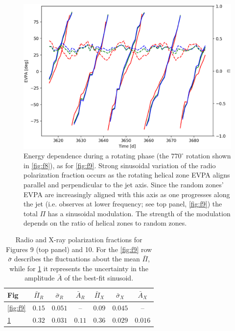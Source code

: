 \begin{figure}[t]
\includegraphics[width=0.8\linewidth]{figures/f10.eps}
\centering
\caption{Energy dependence during a rotating phase (the $770^{\circ}$ rotation shown in \cref{fig:f8}), as for \cref{fig:f9}. Strong sinusoidal variation of the radio polarization fraction occurs as the rotating helical zone EVPA aligns parallel and perpendicular to the jet axis. Since the random zones' EVPA are increasingly aligned with this axis as one progresses along the jet (i.e. observes at lower frequency; see top panel, \cref{fig:f9}) the total $\Pi$ has a sinusoidal modulation. The strength of the modulation depends on the ratio of helical zones to random zones.}
\label{fig:f10}
\end{figure}

\begin{table}[t]
\centering
\begin{tabular}{l c c c c c c}
\toprule
Fig &
$\bar{\Pi}_{R}$ & $\bar{\sigma}_{R}$ & $\bar{A}_{R}$ & $\bar{\Pi}_{X}$ & $\bar{\sigma}_{X}$ & $\bar{A}_{X}$ \\ 
 \midrule
\ref{fig:f9} & $0.15$ & $0.051$ & -- & $0.09$ & $0.045$ & -- \\ 
 \ref{fig:f10} & $0.32$ & $0.031$ & $0.11$ & $0.36$ & $0.029$ & $0.016$ \\ 
 \bottomrule
\end{tabular}
\caption{Radio and X-ray polarization fractions for Figures 9 (top panel) and 10. For the \cref{fig:f9} row $\bar{\sigma}$ describes the fluctuations about the mean $\bar{\Pi}$, while for \cref{fig:f10} it 
represents the uncertainty in the amplitude ${\bar A}$ of the best-fit sinusoid.}
\end{table}

